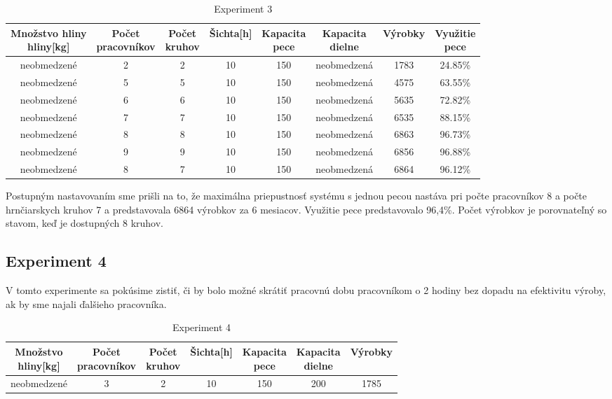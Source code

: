 \documentclass[11pt,a4paper]{article}
\begin{document}
\begin{table}[ht]
	\centering
	\begin{tabular}{|c|c|c|c|c|c|c|c|}
		\hline
		\makecell{Množstvo hliny \\ hliny[kg]} & \makecell{Počet \\ pracovníkov} & \makecell{Počet \\ kruhov} & Šichta[h] & \makecell{Kapacita \\ pece} & \makecell{Kapacita \\ dielne} & Výrobky & \makecell{Využitie \\ pece} \\ \hline
	neobmedzené & 2 & 2 & 10 & 150 & neobmedzená & 1783 & 24.85\%  \\ \hline
        neobmedzené & 5 & 5 & 10 & 150 & neobmedzená & 4575 & 63.55\% \\ \hline
        neobmedzené & 6 & 6 & 10 & 150 & neobmedzená & 5635 & 72.82\% \\ \hline
        neobmedzené & 7 & 7 & 10 & 150 & neobmedzená & 6535 & 88.15\% \\ \hline
        neobmedzené & 8 & 8 & 10 & 150 & neobmedzená & 6863 & 96.73\% \\ \hline
        neobmedzené & 9 & 9 & 10 & 150 & neobmedzená & 6856 & 96.88\% \\ \hline
        neobmedzené & 8 & 7 & 10 & 150 & neobmedzená & 6864 & 96.12\% \\ \hline
	\end{tabular}

	\caption{Experiment 3}
	\label{table:experiment3}
\end{table}

Postupným nastavovaním sme prišli na to, že maximálna priepustnosť systému s jednou pecou nastáva pri počte pracovníkov 8 a počte hrnčiarskych kruhov 7 a predstavovala 6864 výrobkov za 6 mesiacov. Využitie pece predstavovalo 96,4\%. Počet výrobkov je porovnateľný so stavom, keď je dostupných 8 kruhov.
\subsection{Experiment 4}
V tomto experimente sa pokúsime zistiť, či by bolo možné skrátiť pracovnú dobu pracovníkom o 2 hodiny bez dopadu na efektivitu výroby, ak by sme najali ďalšieho pracovníka.
\begin{table}[ht]
	\centering
	\begin{tabular}{|c|c|c|c|c|c|c|}
		\hline
		\makecell{Množstvo \\ hliny[kg]} & \makecell{Počet \\ pracovníkov} & \makecell{Počet \\ kruhov} & Šichta[h] & \makecell{Kapacita \\ pece} & \makecell{Kapacita \\ dielne} & Výrobky \\ \hline
		neobmedzené & 3 & 2 & 10 & 150 & 200 & 1785 \\ \hline
	\end{tabular}

	\caption{Experiment 4}
	\label{table:experiment4}
\end{table}
\end{document}
